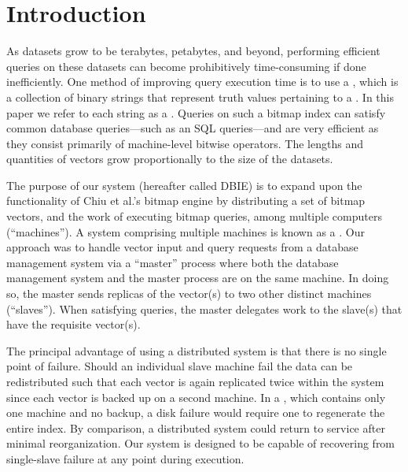 \section{Introduction}
As datasets grow to be terabytes, petabytes, and beyond, performing efficient
queries on these datasets can become prohibitively time-consuming if done
inefficiently. One method of improving query execution time is to use a
, which is a collection of binary strings that represent
truth values pertaining to a . In this paper we refer
to each string as a . Queries on such a bitmap index can
satisfy common database queries---such as an SQL 
queries---and are very efficient as they consist primarily of machine-level
bitwise operators. The lengths and quantities of vectors grow proportionally to
the size of the datasets. \cite{redis}
\par
The purpose of our system (hereafter called DBIE) is to expand upon the
functionality of Chiu et al.'s bitmap engine by distributing a set of bitmap
vectors, and the work of executing bitmap queries, among multiple computers
(``machines''). A system comprising multiple machines is known as a
. Our approach was to handle vector input and query
requests from a database management system via a ``master'' process where both
the database management system and the master process are on the same machine.
In doing so, the master sends replicas of the vector(s) to two other distinct
machines (``slaves''). When satisfying queries, the master delegates work to
the slave(s) that have the requisite vector(s).
\par
The principal advantage of using a distributed system is that there is no
single point of failure. Should an individual slave machine fail the data can
be redistributed such that each vector is again replicated twice within the
system since each vector is backed up on a second machine. In a
, which contains only one machine and no backup, a
disk failure would require one to regenerate the entire index. By comparison,
a distributed system could return to service after minimal reorganization. Our
system is designed to be capable of recovering from single-slave failure at any
point during execution.
